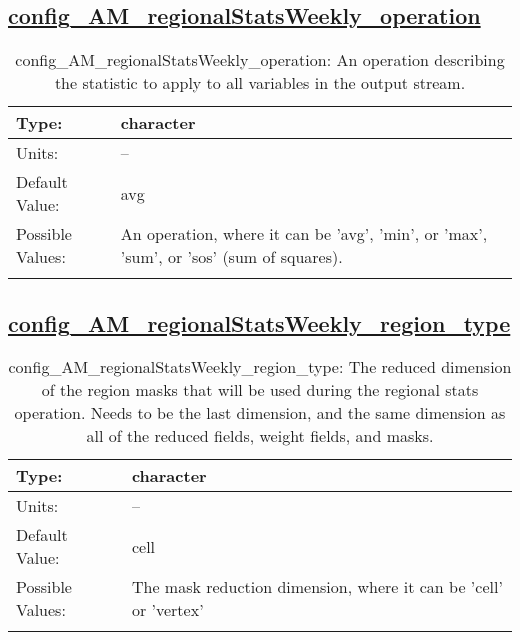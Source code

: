 \subsection[config\_AM\_regionalStatsWeekly\_operation]{\hyperref[sec:nm_tab_AM_regionalStatsWeekly]{config\_AM\_regionalStatsWeekly\_operation}}
\label{subsec:nm_sec_config_AM_regionalStatsWeekly_operation}
\begin{center}
\begin{longtable}{| p{2.0in} || p{4.0in} |}
    \hline
    Type: & character \\
    \hline
    Units: & -- \\
    \hline
    Default Value: & avg \\
    \hline
    Possible Values: & An operation, where it can be 'avg', 'min', or 'max', 'sum', or 'sos' (sum of squares). \\
    \hline
    \caption{config\_AM\_regionalStatsWeekly\_operation: An operation describing the statistic to apply to all variables in the output stream.}
\end{longtable}
\end{center}
\subsection[config\_AM\_regionalStatsWeekly\_region\_type]{\hyperref[sec:nm_tab_AM_regionalStatsWeekly]{config\_AM\_regionalStatsWeekly\_region\_type}}
\label{subsec:nm_sec_config_AM_regionalStatsWeekly_region_type}
\begin{center}
\begin{longtable}{| p{2.0in} || p{4.0in} |}
    \hline
    Type: & character \\
    \hline
    Units: & -- \\
    \hline
    Default Value: & cell \\
    \hline
    Possible Values: & The mask reduction dimension, where it can be 'cell' or 'vertex' \\
    \hline
    \caption{config\_AM\_regionalStatsWeekly\_region\_type: The reduced dimension of the region masks that will be used during the regional stats operation. Needs to be the last dimension, and the same dimension as all of the reduced fields, weight fields, and masks.}
\end{longtable}
\end{center}
